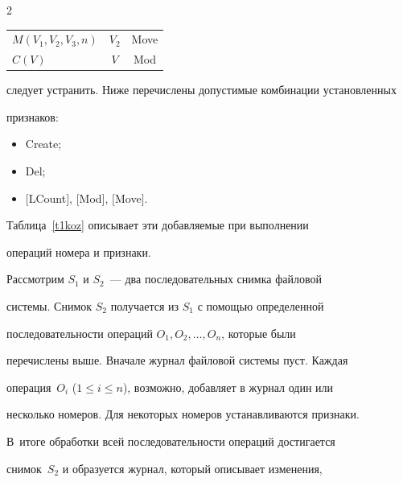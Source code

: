 \begin{multicols}{2}
\begin{table}
\begin{center}
\begin{tabular}{|l|c|c|}
$M(V_1, V_2, V_3, n)$&$V_2$&Move\\


$C(V)$&$V$&Mod\\


\hline


\end{tabular}


\end{center}


\end{table}


следует устранить. Ниже перечислены допустимые комбинации установленных 


признаков:


\pagebreak





\noindent


      \begin{itemize}


\item Create;


\item Del;


\item $[$LCount$]$, $[$Mod$]$, $[$Move$]$.


\end{itemize}





      Таблица~\ref{t1koz} описывает эти добавляемые при выполнении 


операций номера и признаки.





      Рассмотрим $S_1$ и $S_2$~--- два последовательных снимка файловой 


сис\-те\-мы. Снимок $S_2$ получается из $S_1$ с помощью определенной 


по\-сле\-до\-ва\-тель\-ности операций $O_1, O_2, \ldots , O_n$, которые были 


перечислены выше. Вначале журнал файловой сис\-те\-мы пуст. Каж\-дая 


операция~$O_i$ ($1 \leq i \leq n$), возможно, добавляет в журнал один или 


несколько номеров. Для некоторых номеров устанавливаются признаки. 


В~итоге обработки всей последовательности операций достигается 


снимок~$S_2$ и образуется журнал, который описывает изменения, 



\end{multicols}

